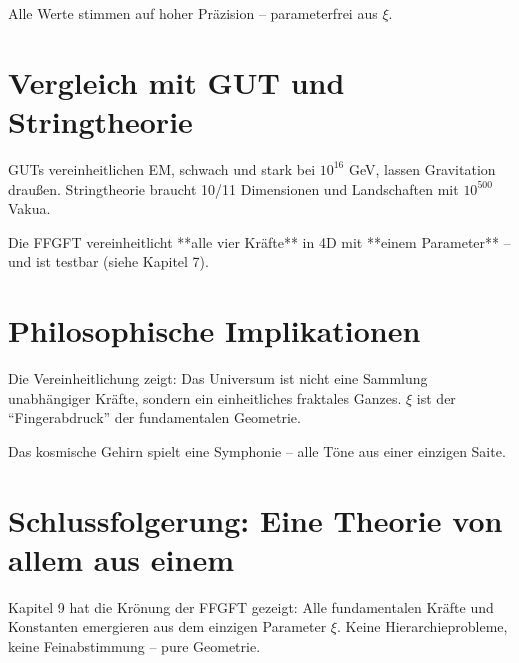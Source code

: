 \begin{center}
	\small
\end{center}
	Alle Werte stimmen auf hoher Präzision – parameterfrei aus \(\xi\).
	
	\section{Vergleich mit GUT und Stringtheorie}
	
	GUTs vereinheitlichen EM, schwach und stark bei \(10^{16}\) GeV, lassen Gravitation draußen. Stringtheorie braucht 10/11 Dimensionen und Landschaften mit \(10^{500}\) Vakua.
	
	Die FFGFT vereinheitlicht **alle vier Kräfte** in 4D mit **einem Parameter** – und ist testbar (siehe Kapitel 7).
	
	\section{Philosophische Implikationen}
	
	Die Vereinheitlichung zeigt: Das Universum ist nicht eine Sammlung unabhängiger Kräfte, sondern ein einheitliches fraktales Ganzes. \(\xi\) ist der \enquote{Fingerabdruck} der fundamentalen Geometrie.
	
	Das kosmische Gehirn spielt eine Symphonie – alle Töne aus einer einzigen Saite.
	
	\section{Schlussfolgerung: Eine Theorie von allem aus einem}
	
	Kapitel 9 hat die Krönung der FFGFT gezeigt: Alle fundamentalen Kräfte und Konstanten emergieren aus dem einzigen Parameter \(\xi\). Keine Hierarchieprobleme, keine Feinabstimmung – pure Geometrie.
	
